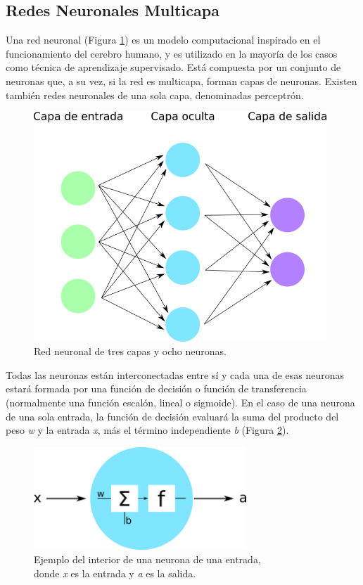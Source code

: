 \subsection{Redes Neuronales Multicapa}

Una red neuronal (Figura \ref{fig:red_neuronal}) es un modelo computacional inspirado en el funcionamiento del cerebro humano, y es utilizado en la mayoría de los casos como técnica de aprendizaje supervisado. Está compuesta por un conjunto de neuronas que, a su vez, si la red es multicapa, forman capas de neuronas. Existen también redes neuronales de una sola capa, denominadas perceptrón.\\

\begin{figure} [h!]
  \begin{center}
    \includegraphics[width=11cm]{figs/redes_neuronales.png}
  \end{center}
  \caption{Red neuronal de tres capas y ocho neuronas.}
  \label{fig:red_neuronal}
\end{figure}

Todas las neuronas están interconectadas entre sí y cada una de esas neuronas estará formada por una función de decisión o función de transferencia (normalmente una función escalón, lineal o sigmoide). En el caso de una neurona de una sola entrada, la función de decisión evaluará la suma del producto del peso \textit{w} y la entrada \textit{x}, más el término independiente \textit{b} (Figura \ref{fig:neurona}).\\

\begin{figure} [h!]
  \begin{center}
    \includegraphics[width=8cm]{figs/neurona.png}
  \end{center}
  \captionsetup{justification=centering}
  \caption{Ejemplo del interior de una neurona de una entrada,\\
  donde \textit{x} es la entrada y \textit{a} es la salida.}
  \label{fig:neurona}
\end{figure}

